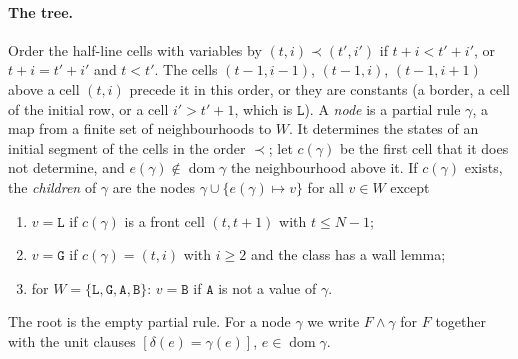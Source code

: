 \documentclass[11pt]{article}
\theoremstyle{remark}
\newcommand{\Lq}{\mathtt{L}}\newcommand{\Gq}{\mathtt{G}}\newcommand{\Aq}{\mathtt{A}}\newcommand{\Bq}{\mathtt{B}}\newcommand{\Fq}{\mathtt{F}}
\begin{document}
\paragraph{The tree.} Order the half-line cells with variables by
$(t,i)\prec(t',i')$ if $t+i<t'+i'$, or $t+i=t'+i'$ and $t<t'$. The cells $(t-1,i-1)$, $(t-1,i)$,
$(t-1,i+1)$ above a cell $(t,i)$ precede it in this order, or they are constants (a border, a cell of the
initial row, or a cell $i'>t'+1$, which is $\Lq$). A \emph{node} is a partial rule $\gamma$, a map from a finite
set of neighbourhoods to $W$. It determines the states of an initial segment of the cells in the order
$\prec$; let $c(\gamma)$ be the first cell that it does not determine, and $e(\gamma)\notin\operatorname{dom}\gamma$ the
neighbourhood above it. If $c(\gamma)$ exists, the \emph{children} of $\gamma$ are the nodes
$\gamma\cup\{e(\gamma)\mapsto v\}$ for all $v\in W$ except
\begin{enumerate}[label=\textup{(\alph*)},nosep]
\item $v=\Lq$ if $c(\gamma)$ is a front cell $(t,t+1)$ with $t\le N-1$;
\item $v=\Gq$ if $c(\gamma)=(t,i)$ with $i\ge2$ and the class has a wall lemma;
\item for $W=\{\Lq,\Gq,\Aq,\Bq\}$: $v=\Bq$ if $\Aq$ is not a value of $\gamma$.
\end{enumerate}
The root is the empty partial rule. For a node $\gamma$ we write $F\wedge\gamma$ for $F$ together with the
unit clauses $[\delta(e)=\gamma(e)]$, $e\in\operatorname{dom}\gamma$.
\end{document}
